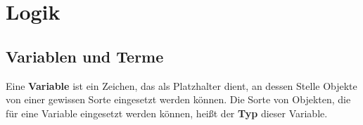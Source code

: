 

    

\chapter{Logik} \label{kap:logik}


\section{Variablen und Terme}


\begin{defin}[* Variable] \label{def:variable}  
    Eine \textbf{Variable} ist ein Zeichen, das als Platzhalter dient, an dessen Stelle Objekte von einer gewissen Sorte eingesetzt werden können. Die Sorte von Objekten, die für eine Variable eingesetzt werden können, heißt der \textbf{Typ} dieser Variable.
\end{defin}


